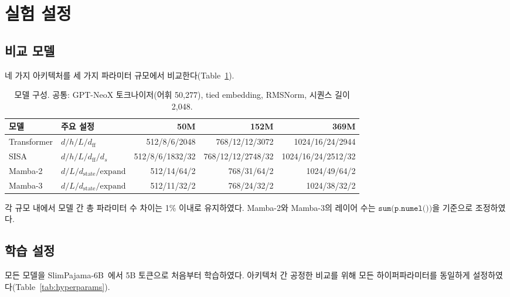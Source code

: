 \documentclass[11pt]{article}
\begin{document}
\section{실험 설정}

\subsection{비교 모델}

네 가지 아키텍처를 세 가지 파라미터 규모에서 비교한다(Table~\ref{tab:model_configs}).

\begin{table}[h]
\centering
\small
\caption{모델 구성. 공통: GPT-NeoX 토크나이저(어휘 50,277), tied embedding, RMSNorm, 시퀀스 길이 2,048.}
\label{tab:model_configs}
\begin{tabular}{llrrr}
\toprule
\textbf{모델} & \textbf{주요 설정} & \textbf{50M} & \textbf{152M} & \textbf{369M} \\
\midrule
Transformer & $d/h/L/d_{\text{ff}}$ & 512/8/6/2048 & 768/12/12/3072 & 1024/16/24/2944 \\
SISA & $d/h/L/d_{\text{ff}}/d_s$ & 512/8/6/1832/32 & 768/12/12/2748/32 & 1024/16/24/2512/32 \\
Mamba-2 & $d/L/d_{\text{state}}/\text{expand}$ & 512/14/64/2 & 768/31/64/2 & 1024/49/64/2 \\
Mamba-3 & $d/L/d_{\text{state}}/\text{expand}$ & 512/11/32/2 & 768/24/32/2 & 1024/38/32/2 \\
\bottomrule
\end{tabular}
\end{table}

각 규모 내에서 모델 간 총 파라미터 수 차이는 1\% 이내로 유지하였다. Mamba-2와 Mamba-3의 레이어 수는 $\texttt{sum(p.numel())}$을 기준으로 조정하였다.

\subsection{학습 설정}

모든 모델을 SlimPajama-6B~\citep{slimpajama}에서 5B 토큰으로 처음부터 학습하였다. 아키텍처 간 공정한 비교를 위해 모든 하이퍼파라미터를 동일하게 설정하였다(Table~\ref{tab:hyperparams}).
\end{document}
